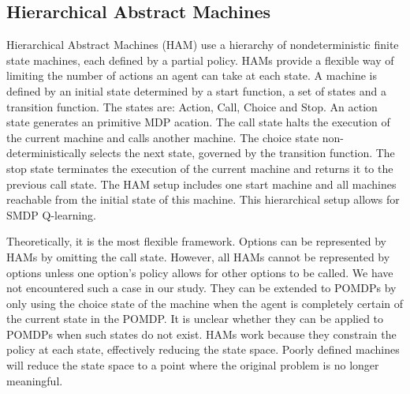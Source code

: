 \subsection{Hierarchical Abstract Machines}

Hierarchical Abstract Machines (HAM) use a hierarchy of nondeterministic finite state machines, each defined by a partial policy.
HAMs provide a flexible way of limiting the number of actions an agent can take at each state.
A machine is defined by an initial state determined by a start function, a set of states and a transition function.
The states are: Action, Call, Choice and Stop. An action state generates
an primitive MDP acation. The call state halts the
execution of the current machine and calls another
machine. The choice state non-deterministically selects the next state, governed by the transition function. The
stop state terminates the execution of the current machine and returns it to the previous call state. The HAM setup includes one start machine and all machines reachable from the initial state of this machine. This hierarchical setup allows for SMDP Q-learning. \cite{Parr}

Theoretically, it is the most flexible framework. Options can be represented by HAMs by omitting the call state. However, all HAMs cannot be represented by options unless one option's policy allows for other options to be called. We have not encountered such a case in our study. They can be extended to POMDPs by only using the choice state of the machine when the agent is completely certain of the current state in the POMDP. It is unclear whether they can be applied to POMDPs when such states do not exist. HAMs work because they constrain the policy at each state, effectively reducing the state space. Poorly defined machines will reduce the state space to a point where the original problem is no longer meaningful. 
